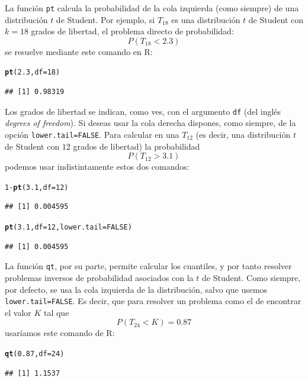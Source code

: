 \documentclass[10pt,a4paper]{article}\usepackage[]{graphicx}\usepackage[]{color}
\makeatletter
\newcommand{\hlnum}[1]{\textcolor[rgb]{0.686,0.059,0.569}{#1}}%
\newcommand{\hlopt}[1]{\textcolor[rgb]{0,0,0}{#1}}%
\newcommand{\hlstd}[1]{\textcolor[rgb]{0.345,0.345,0.345}{#1}}%
\newcommand{\hlkwc}[1]{\textcolor[rgb]{0.333,0.667,0.333}{#1}}%
\newcommand{\hlkwd}[1]{\textcolor[rgb]{0.737,0.353,0.396}{\textbf{#1}}}%
\newenvironment{kframe}{%
 \def\at@end@of@kframe{}%
 \ifinner\ifhmode%
  \def\at@end@of@kframe{\end{minipage}}%
  \begin{minipage}{\columnwidth}%
 \fi\fi%
 \def\FrameCommand##1{\hskip\@totalleftmargin \hskip-\fboxsep
 \colorbox{shadecolor}{##1}\hskip-\fboxsep
     \hskip-\linewidth \hskip-\@totalleftmargin \hskip\columnwidth}%
 \MakeFramed {\advance\hsize-\width
   \@totalleftmargin\z@ \linewidth\hsize
   \@setminipage}}%
 {\par\unskip\endMakeFramed%
 \at@end@of@kframe}
\newenvironment{knitrout}{}{} %
\newcounter {cont01}
\makeatother
\begin{document}
La función {\tt pt} calcula la probabilidad de la cola izquierda (como siempre) de una distribución $t$ de Student. Por ejemplo, si $T_{18}$ es una distribución $t$ de Student con $k=18$ grados de libertad, el problema directo de probabilidad:
\[P(T_{18} < 2.3)\]
se resuelve mediante este comando en R:
\begin{knitrout}
\color{fgcolor}\begin{kframe}
\begin{alltt}
\hlkwd{pt}\hlstd{(}\hlnum{2.3}\hlstd{,} \hlkwc{df} \hlstd{=} \hlnum{18}\hlstd{)}
\end{alltt}
\begin{verbatim}
## [1] 0.98319
\end{verbatim}
\end{kframe}
\end{knitrout}
Los grados de libertad se indican, como ves, con el argumento {\tt df} (del inglés {\em degrees of freedom}). Si deseas usar la cola derecha dispones, como siempre, de la opción {\tt lower.tail=FALSE}. Para calcular en una $T_{12}$ (es decir, una distribución $t$ de Student con $12$ grados de libertad) la probabilidad
\[P\left(T_{12}> 3.1 \right)\]
podemos usar indistintamente estos dos comandos:
\begin{knitrout}
\color{fgcolor}\begin{kframe}
\begin{alltt}
\hlnum{1} \hlopt{-} \hlkwd{pt}\hlstd{(}\hlnum{3.1}\hlstd{,} \hlkwc{df} \hlstd{=} \hlnum{12}\hlstd{)}
\end{alltt}
\begin{verbatim}
## [1] 0.004595
\end{verbatim}
\begin{alltt}
\hlkwd{pt}\hlstd{(}\hlnum{3.1}\hlstd{,} \hlkwc{df} \hlstd{=} \hlnum{12}\hlstd{,} \hlkwc{lower.tail}\hlstd{=}\hlnum{FALSE}\hlstd{)}
\end{alltt}
\begin{verbatim}
## [1] 0.004595
\end{verbatim}
\end{kframe}
\end{knitrout}

La función {\tt qt}, por su parte, permite calcular los cuantiles, y por tanto resolver problemas inversos de probabilidad asociados con la $t$ de Student. Como siempre, por defecto, se usa la cola izquierda de la distribución, salvo que usemos {\tt lower.tail=FALSE}. Es decir, que para resolver un problema como el de encontrar el valor $K$ tal que
\[P(T_{24} < K) = 0.87\]
usaríamos este comando de R:
\begin{knitrout}
\color{fgcolor}\begin{kframe}
\begin{alltt}
\hlkwd{qt}\hlstd{(}\hlnum{0.87}\hlstd{,} \hlkwc{df} \hlstd{=} \hlnum{24}\hlstd{)}
\end{alltt}
\begin{verbatim}
## [1] 1.1537
\end{verbatim}
\end{kframe}
\end{knitrout}
\end{document}
